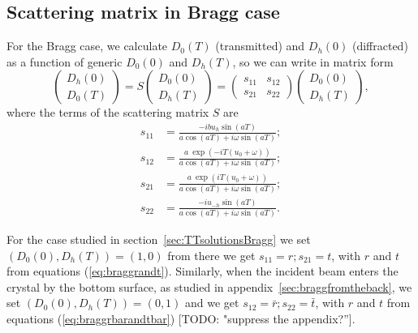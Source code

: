 \documentclass{iucr}
\newcommand{\todo}[1]{{\color{red}[TODO: "#1'']}}
\begin{document}
\subsection{Scattering matrix in Bragg case}
For the Bragg case, we calculate $D_0(T)$ (transmitted) and $D_h(0)$ (diffracted) as a function of generic $D_0(0)$ and $D_h(T)$, so we can write in matrix form
\begin{equation}
    \begin{pmatrix}
    D_h(0)\\
    D_0(T)
    \end{pmatrix}
    =
    S
        \begin{pmatrix}
    D_0(0) \\
    D_h(T)
    \end{pmatrix}
    =
    \begin{pmatrix}
    s_{11} & s_{12}\\
    s_{21} & s_{22}
    \end{pmatrix}
    \begin{pmatrix}
    D_0(0) \\
    D_h(T)
    \end{pmatrix},
\end{equation}
where the terms of the scattering matrix $S$ are 
\begin{subequations}\label{eq:scatteringMatrixBragg }
\begin{align}
s_{11} &= \frac{-i b u_h \sin(a T)}{a \cos(a T) + i \omega \sin(a T)};\\
s_{12} &= \frac{a~\exp(-i T (u_0+ \omega))}{a \cos(a T) + i \omega \sin(a T)};\\
s_{21} &= \frac{a~\exp(i T (u_0+ \omega))}{a \cos(a T) + i \omega \sin(a T)};\\
s_{22} &= \frac{-i u_{-h} \sin(a T)}{a \cos(a T) + i \omega \sin(a T)}.
\end{align}
\end{subequations}


For the case studied in section~\ref{sec:TTsolutionsBragg} we set $(D_0(0),D_h(T))=(1,0)$ from there we get $s_{11}=r; s_{21}=t$, with $r$ and $t$ from equations (\ref{eq:braggrandt}). Similarly, when the incident beam enters the crystal by the bottom surface, as studied in appendix~\ref{sec:braggfromtheback}, we set $(D_0(0),D_h(T))=(0,1)$ and  we get $s_{12}=\bar{r}; s_{22}=\bar{t}$, with $r$ and $t$ from equations (\ref{eq:braggrbarandtbar}) \todo{suppress the appendix?}.
\end{document}
